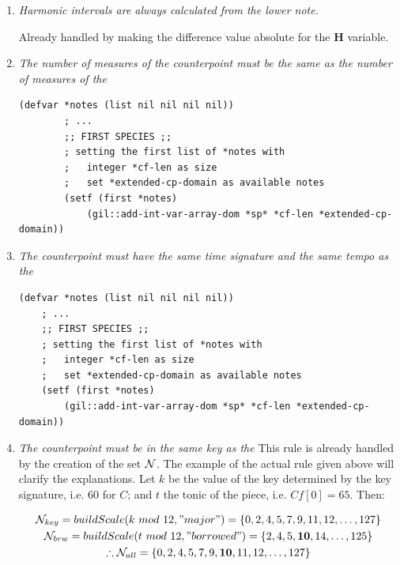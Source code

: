 \begin{enumerate}[wide, label=\bfseries G\arabic*]
    \item \textit{Harmonic intervals are always calculated from the lower note.} \label{rule:hfromlower}

    Already handled by making the difference value absolute for the \textbf{H} variable. 

    \item \textit{The number of measures of the counterpoint must be the same as the number of measures of the \cfdot} \label{rule:sameNbMeasures}

    \begin{lstlisting}[caption=Definition of $N$ in the first species., label=lst:defcp, basicstyle=\ttfamily\small]
        (defvar *notes (list nil nil nil nil))
        ; ...
        ;; FIRST SPECIES ;;
        ; setting the first list of *notes with
        ;   integer *cf-len as size
        ;   set *extended-cp-domain as available notes
        (setf (first *notes)
            (gil::add-int-var-array-dom *sp* *cf-len *extended-cp-domain))
        \end{lstlisting}

    \item \textit{The counterpoint must have the same time signature and the same tempo as the \cfdot} \label{rule:sameTimeSignature}

    \begin{lstlisting}[caption=Definition of $N$ in the first species., label=lst:defcp, basicstyle=\ttfamily\small]
    (defvar *notes (list nil nil nil nil))
    ; ...
    ;; FIRST SPECIES ;;
    ; setting the first list of *notes with
    ;   integer *cf-len as size
    ;   set *extended-cp-domain as available notes
    (setf (first *notes)
        (gil::add-int-var-array-dom *sp* *cf-len *extended-cp-domain))
    \end{lstlisting}
    
    \item \textit{The counterpoint must be in the same key as the \cfdot}\label{rule:samekey}
    This rule is already handled by the creation of the set $\mathcal{N}$. The example of the actual rule given above will clarify the explanations. Let $k$ be the value of the key determined by the key signature, i.e. $60$ for $C$; and $t$ the tonic of the piece, i.e. $Cf[0]=65$. Then:

    \begin{equation*}
        \begin{gathered}
            \mathcal{N}_{key} = buildScale(k\ mod\ 12, "major") = \{0, 2, 4, 5, 7, 9, 11, 12, \dots, 127\}\\
            \mathcal{N}_{brw} = buildScale(t\ mod\ 12, "borrowed") = \{2, 4, 5, \textbf{10}, 14, \dots, 125\}\\
            \therefore \mathcal{N}_{all}=\{0, 2, 4, 5, 7, 9, \textbf{10}, 11, 12, \dots, 127\}
        \end{gathered}
    \end{equation*}


\end{enumerate}
